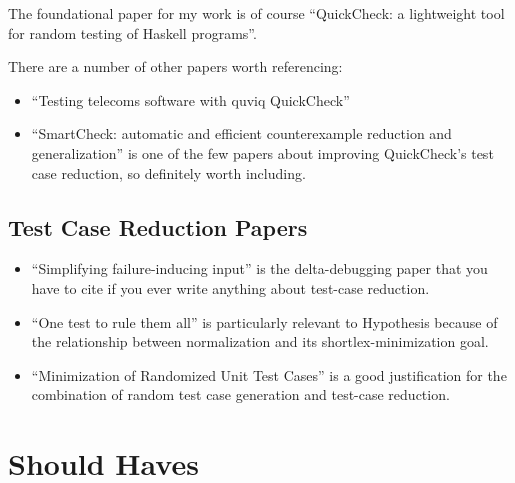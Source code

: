 The foundational paper for my work is of course ``QuickCheck: a lightweight tool for random testing of Haskell programs''\cite{DBLP:conf/icfp/ClaessenH00}.

There are a number of other papers worth referencing:

\begin{itemize}
\item ``Testing telecoms software with quviq QuickCheck''\cite{DBLP:conf/erlang/ArtsHJW06}
\item ``SmartCheck: automatic and efficient counterexample reduction and generalization''\cite{DBLP:conf/haskell/Pike14} is one of the few papers about improving QuickCheck's test case reduction,
so definitely worth including.
\end{itemize}

\subsection{Test Case Reduction Papers}

\begin{itemize}
\item ``Simplifying failure-inducing input''\cite{DBLP:conf/issta/HildebrandtZ00} is the delta-debugging paper that you have to cite if you ever write anything about test-case reduction.
\item ``One test to rule them all''\cite{DBLP:conf/issta/GroceHK17} is particularly relevant to Hypothesis because of the relationship between normalization and its shortlex-minimization goal.
\item ``Minimization of Randomized Unit Test Cases''\cite{DBLP:conf/issre/LeiA05} is a good justification for the combination of random test case generation and test-case reduction.
\end{itemize}


\section{Should Haves}

